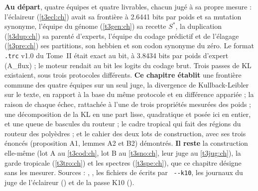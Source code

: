 \begin{origine}
\textbf{Au départ}, quatre équipes et quatre livrables, chacun jugé à sa propre mesure : l'éclaireur (\cref{t3ecl:ch}) avait sa frontière à \num{2.6441} bits par poids et sa mutation synonyme, l'équipe du génome (\cref{t3gen:ch}) sa recette $S^{*}$, la duplication (\cref{t3dup:ch}) sa parenté d'experts, l'équipe du codage prédictif et de l'élagage (\cref{t3pre:ch}) ses partitions, son hebbien et son codon synonyme du zéro. Le format \texttt{.trc} v1.0 du Tome~II était exact au bit, à \num{3.8434} bits par poids d'expert (A\_flux) ; le moteur rendait au bit les logits du codage brut. Trois passes de KL existaient, sous trois protocoles différents.
\textbf{Ce chapitre établit} une frontière commune des quatre équipes sur un seul juge, la divergence de Kullback-Leibler sur le texte, en rapport à la base du même protocole et en différence appariée ; la raison de chaque échec, rattachée à l'une de trois propriétés mesurées des poids ; une décomposition de la KL en une part lisse, quadratique et posée ici en entier, et une queue de bascules du routeur ; le cadre tropical qui fait des régions du routeur des polyèdres ; et le cahier des deux lots de construction, avec ses trois énoncés (proposition A1, lemmes A2 et B2) démontrés.
\textbf{Il reste} la construction elle-même (lot A au \cref{t3cod:ch}, lot B au \cref{t3sno:ch}, leur juge au \cref{t3jug:ch}), la garde tropicale (\cref{t3tro:ch}) et les spectres (\cref{t3spe:ch}), que ce chapitre désigne sans les mesurer.
Sources : , , les fichiers de  écrits par ~\texttt{-{}-k10}, les journaux du juge de l'éclaireur () et de la passe K10 ().
\end{origine}

